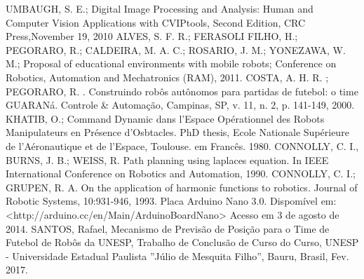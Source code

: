 \begin{thebibliography}{99}

 UMBAUGH, S. E.; Digital Image Processing and Analysis: Human and Computer Vision Applications with CVIPtools, Second Edition, CRC Press,November 19, 2010
 ALVES, S. F. R.; FERASOLI FILHO, H.; PEGORARO, R.; CALDEIRA, M. A. C.; ROSARIO, J. M.; YONEZAWA, W. M.; Proposal of educational environments with mobile robots; Conference on Robotics, Automation and Mechatronics (RAM), 2011.
 COSTA, A. H. R. ; PEGORARO, R. . Construindo robôs autônomos para partidas de futebol: o time GUARANá. Controle \& Automação, Campinas, SP, v. 11, n. 2, p. 141-149, 2000.
 KHATIB, O.; Command Dynamic dans l'Espace Opérationnel des Robots Manipulateurs en Présence d'Osbtacles. PhD thesis, Ecole Nationale Supérieure de l'Aéronautique et de l'Espace, Toulouse. em Francês. 1980.
 CONNOLLY, C. I., BURNS, J. B.; WEISS, R. Path planning using laplaces equation. In IEEE International Conference on Robotics and Automation, 1990.
 CONNOLLY, C. I.; GRUPEN, R. A. On the application of harmonic functions to robotics. Journal of Robotic Systems, 10:931-946, 1993. Placa Arduino Nano 3.0. Dispomível em: <http://arduino.cc/en/Main/ArduinoBoardNano> Acesso em 3 de agosto de 2014.
 SANTOS, Rafael, Mecanismo de Previsão de Posição para o Time de Futebol de Robôs da UNESP, Trabalho de Conclusão de Curso do Curso, UNESP - Universidade Estadual Paulista ''Júlio de Mesquita Filho'', Bauru, Brasil, Fev. 2017.

\end{thebibliography} 
